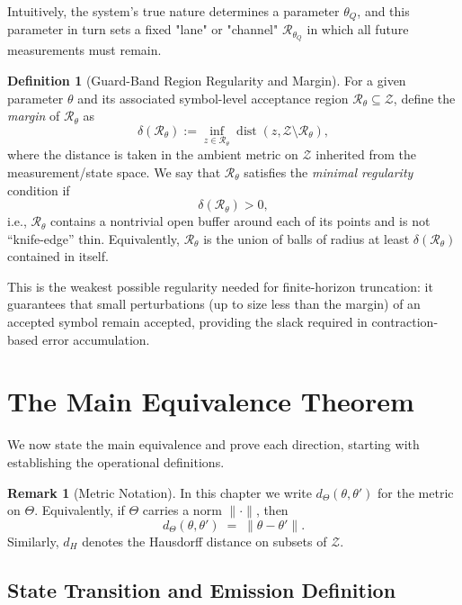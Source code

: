 \documentclass[12pt]{article}
\theoremstyle{definition}
\newtheorem{definition}{Definition}[section]
\newtheorem{remark}{Remark}[section]
\theoremstyle{plain}
\begin{document}
Intuitively, the system's true nature determines a parameter $\theta_Q$, and this parameter in turn sets a fixed "lane" or "channel" $\mathcal{R}_{\theta_Q}$ in which all future measurements must remain.

\begin{definition}[Guard-Band Region Regularity and Margin]
For a given parameter $\theta$ and its associated symbol-level acceptance region $\mathcal{R}_\theta \subseteq \mathcal{Z}$, define the \emph{margin} of $\mathcal{R}_\theta$ as
\[
\delta(\mathcal{R}_\theta) := \inf_{z\in\mathcal{R}_\theta} \operatorname{dist}(z,\mathcal{Z}\setminus \mathcal{R}_\theta),
\]
where the distance is taken in the ambient metric on $\mathcal{Z}$ inherited from the measurement/state space. We say that $\mathcal{R}_\theta$ satisfies the \emph{minimal regularity} condition if
\[
\delta(\mathcal{R}_\theta) > 0,
\]
i.e., $\mathcal{R}_\theta$ contains a nontrivial open buffer around each of its points and is not “knife-edge” thin. Equivalently, $\mathcal{R}_\theta$ is the union of balls of radius at least $\delta(\mathcal{R}_\theta)$ contained in itself.

This is the weakest possible regularity needed for finite-horizon truncation: it guarantees that small perturbations (up to size less than the margin) of an accepted symbol remain accepted, providing the slack required in contraction-based error accumulation.
\end{definition}


\section{The Main Equivalence Theorem}

We now state the main equivalence and prove each direction, starting with establishing the operational definitions.

\begin{remark}[Metric Notation]
In this chapter we write \(d_\Theta(\theta,\theta')\) for the metric on \(\Theta\).  Equivalently, if \(\Theta\) carries a norm \(\|\cdot\|\), then
\[
  d_\Theta(\theta,\theta') \;=\;\|\theta-\theta'\|.
\]
Similarly, \(d_H\) denotes the Hausdorff distance on subsets of \(\mathcal Z\).
\end{remark}


\subsection{State Transition and Emission Definition}
\end{document}

